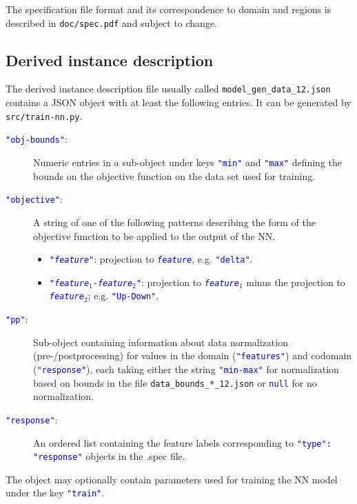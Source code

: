 \documentclass[a4paper,parskip=half]{article} %
\newcommand*\cmdstyle\texttt
\newcommand*\file\cmdstyle
\newcommand*\literalColor{blue}
\newcommand*\cmd[1]{\cmdstyle{\textcolor{red!85!black}{#1}}}
\newcommand*\literal[1]{\textcolor{\literalColor}{\cmdstyle{#1}}}
\newcommand*\trainnn{train-nn.py}
\begin{document}
The specification file format and its correspondence to domain and regions is
described in \file{doc/spec.pdf} and subject to change.


\subsection{Derived instance description}\label{sec:.gen}
The derived instance description file usually called
\file{model\_gen\_data\_12.json} contains a JSON object with at least
the following entries. It can be generated by
\cmd{src/\trainnn}.
\begin{description}
\item[\literal{"obj-bounds"}:]
	Numeric entries in a sub-object under keys \literal{"min"} and
	\literal{"max"} defining the bounds on the objective function on the
	data set used for training.
\item[\literal{"objective"}:]
	A string of one of the following patterns describing the form of the
	objective function to be applied to the output of the NN.
	\begin{itemize}
	\item\literal{"\emph{feature}"}:
		projection to \literal{\emph{feature}}, e.g. \literal{"delta"}.
	\item\literal{"\emph{feature$_1$}-\emph{feature$_2$}"}:
		projection to \literal{\emph{feature$_1$}} minus the
		projection to \literal{\emph{feature$_2$}}; e.g.
		\literal{"Up-Down"}.
	\end{itemize}
\item[\literal{"pp"}:]
	Sub-object containing information about data normalization
	(pre-/postprocessing) for values in the domain (\literal{"features"})
	and codomain (\literal{"response"}), each taking either the string
	\literal{"min-max"} for normalization based on bounds in the file
	\file{data\_bounds\_*\_12.json} or \literal{null} for no normalization.
\item[\literal{"response"}:]
	An ordered list containing the feature labels corresponding to
	\literal{"type": "response"} objects in the .spec file.
\end{description}
The object may optionally contain parameters used for training the NN model under
the key \literal{"train"}.
\end{document}
